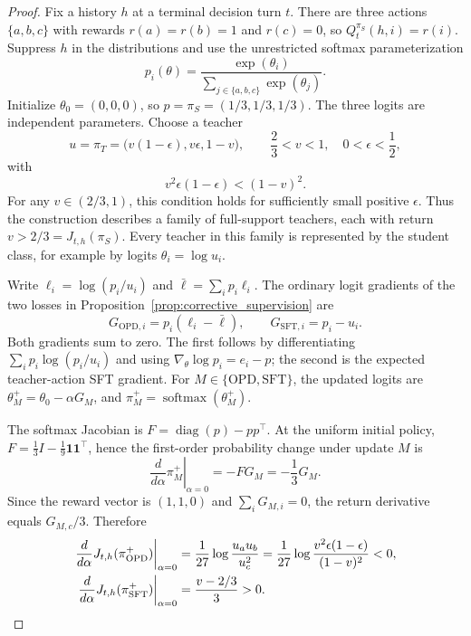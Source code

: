 \begin{proof}
Fix a history $h$ at a terminal decision turn $t$. There are three actions $\{a,b,c\}$ with rewards $r(a)=r(b)=1$ and $r(c)=0$, so $Q_t^{\pi_S}(h,i)=r(i)$. Suppress $h$ in the distributions and use the unrestricted softmax parameterization
\[
p_i(\theta)=\frac{\exp(\theta_i)}{\sum_{j\in\{a,b,c\}}\exp(\theta_j)}.
\]
Initialize $\theta_0=(0,0,0)$, so $p=\pi_S=(1/3,1/3,1/3)$. The three logits are independent parameters. Choose a teacher
\[
u=\pi_T=\bigl(v(1-\epsilon),v\epsilon,1-v\bigr),
\qquad
\frac23<v<1,\quad 0<\epsilon<\frac12,
\]
with
\begin{equation}
v^2\epsilon(1-\epsilon)<(1-v)^2.
\label{eq:corrective_teacher_family}
\end{equation}
For any $v\in(2/3,1)$, this condition holds for sufficiently small positive $\epsilon$. Thus the construction describes a family of full-support teachers, each with return $v>2/3=J_{t,h}(\pi_S)$. Every teacher in this family is represented by the student class, for example by logits $\theta_i=\log u_i$.

Write $\ell_i=\log(p_i/u_i)$ and $\bar\ell=\sum_i p_i\ell_i$. The ordinary logit gradients of the two losses in Proposition~\ref{prop:corrective_supervision} are
\begin{equation}
G_{\mathrm{OPD},i}=p_i(\ell_i-\bar\ell),
\qquad
G_{\mathrm{SFT},i}=p_i-u_i.
\label{eq:corrective_gradients}
\end{equation}
Both gradients sum to zero. The first follows by differentiating $\sum_i p_i\log(p_i/u_i)$ and using $\nabla_\theta\log p_i=e_i-p$; the second is the expected teacher-action SFT gradient. For $M\in\{\mathrm{OPD},\mathrm{SFT}\}$, the updated logits are $\theta_M^+=\theta_0-\alpha G_M$, and $\pi_M^+=\operatorname{softmax}(\theta_M^+)$.

The softmax Jacobian is $F=\operatorname{diag}(p)-pp^\top$. At the uniform initial policy, $F=\frac13 I-\frac19\mathbf1\mathbf1^\top$, hence the first-order probability change under update $M$ is
\[
\left.\frac{d}{d\alpha}\pi_M^+\right|_{\alpha=0}
=-FG_M=-\frac13G_M.
\]
Since the reward vector is $(1,1,0)$ and $\sum_iG_{M,i}=0$, the return derivative equals $G_{M,c}/3$. Therefore
\begin{align}
\left.\frac{d}{d\alpha}J_{t,h}(\pi_{\mathrm{OPD}}^+)\right|_{\alpha=0}
&=\frac1{27}\log\frac{u_a u_b}{u_c^2}
=\frac1{27}\log\frac{v^2\epsilon(1-\epsilon)}{(1-v)^2}<0,\notag\\
\left.\frac{d}{d\alpha}J_{t,h}(\pi_{\mathrm{SFT}}^+)\right|_{\alpha=0}
&=\frac{v-2/3}{3}>0.
\label{eq:corrective_return_derivatives}
\end{align}


\end{proof}

